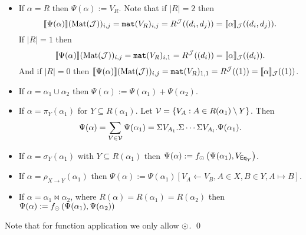 \begin{itemize}
  \item If $\alpha = R$ then $\Psi (\alpha):=V_R$. Note that if $|R|=2$ then 
    $$\llbracket \Psi(\alpha) \rrbracket(\text{Mat}(\mathcal{J}))_{i,j}=\texttt{mat}(V_R)_{i,j} = R^{\mathcal{J}}((d_i, d_j))=\llbracket \alpha \rrbracket_{\mathcal{J}}((d_i, d_j)).$$ 
    If $|R|=1$ then 
    $$\llbracket \Psi(\alpha) \rrbracket(\text{Mat}(\mathcal{J}))_{i,j}=\texttt{mat}(V_R)_{i,1} = R^{\mathcal{J}}((d_i))=\llbracket \alpha \rrbracket_{\mathcal{J}}((d_i)).$$
    And if $|R|=0$ then 
    $\llbracket \Psi(\alpha) \rrbracket(\text{Mat}(\mathcal{J}))_{i,j}=\texttt{mat}(V_R)_{1,1} = R^{\mathcal{J}}((1))=\llbracket \alpha \rrbracket_{\mathcal{J}}((1))$.
  \item If $\alpha=\alpha_1\cup\alpha_2$ then $\Psi(\alpha):=\Psi(\alpha_1)+\Psi(\alpha_2)$.
  \item If $\alpha = \pi_{Y}(\alpha_1)$ for $Y\subseteq R(\alpha_1)$. Let $\mathcal{V} = \lbrace V_A:A\in R(\alpha_1)\setminus Y \rbrace$. 
    Then
    $$
    \Psi(\alpha) = \sum_{V\in\mathcal{V}} \Psi(\alpha_1) = \Sigma V_{A_1}. \Sigma \cdots \Sigma V_{A_{l}}. \Psi(\alpha_1).
    $$
  \item If $\alpha = \sigma_Y(\alpha_1)$ with $Y\subseteq R(\alpha_1)$ then 
    $\Psi(\alpha):=f_{\odot}\left( \Psi(\alpha_1), V_{\mathsf{Eq}_Y} \right)$.
  \item If $\alpha = \rho_{X\rightarrow Y}(\alpha_1)$ then $\Psi (\alpha):= \Psi (\alpha_1)\left[ V_A\gets V_B, A\in X, B\in Y, A \mapsto B \right]$.
  \item If $\alpha = \alpha_1\Join \alpha_2$, where $R(\alpha)=R(\alpha_1)=R(\alpha_2)$ then 
    $\Psi (\alpha):=f_{\odot}\left( \Psi (\alpha_1), \Psi (\alpha_2) \right)$
\end{itemize}

Note that for function application we only allow $\odot$.
\qed